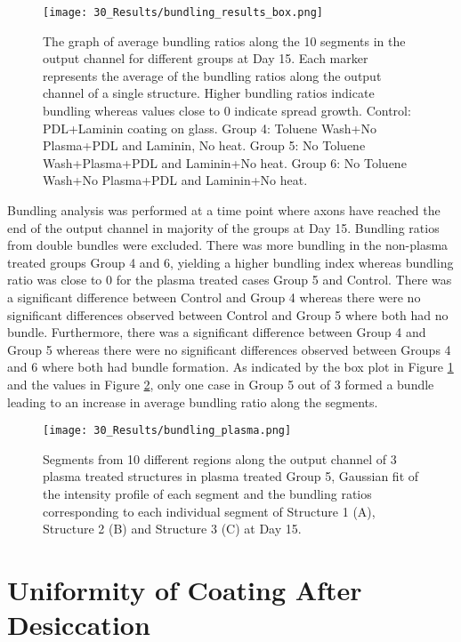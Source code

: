 \begin{figure}[H]
\centering
\texttt{[image: 30\_Results/bundling\_results\_box.png]}
\caption{The graph of average bundling ratios along the 10 segments in the output channel for different groups at Day 15. Each marker represents the average of the bundling ratios along the output channel of a single structure. Higher bundling ratios indicate bundling whereas values close to 0 indicate spread growth. Control: PDL+Laminin coating on glass. Group 4: Toluene Wash+No Plasma+PDL and Laminin, No heat. Group 5: No Toluene Wash+Plasma+PDL and Laminin+No heat. Group 6: No Toluene Wash+No Plasma+PDL and Laminin+No heat.}
\label{fig:BundlingRatios}
\end{figure}

Bundling analysis was performed at a time point where axons have reached the end of the output channel in majority of the groups at Day 15. Bundling ratios from double bundles were excluded. There was more bundling in the non-plasma treated groups Group 4 and 6, yielding a higher bundling index whereas bundling ratio was close to 0 for the plasma treated cases Group 5 and Control. There was a significant difference between Control and Group 4 whereas there were no significant differences observed between Control and Group 5 where both had no bundle. Furthermore, there was a significant difference between Group 4 and Group 5 whereas there were no significant differences observed between Groups 4 and 6 where both had bundle formation. As indicated by the box plot in Figure \ref{fig:BundlingRatios} and the values in Figure \ref{fig:BundlingRatios_plasma}, only one case in Group 5 out of 3 formed a bundle leading to an increase in average bundling ratio along the segments.

\begin{figure}[H]
\centering
\texttt{[image: 30\_Results/bundling\_plasma.png]}
\caption{Segments from 10 different regions along the output channel of 3 plasma treated structures in plasma treated Group 5, Gaussian fit of the intensity profile of each segment and the bundling ratios corresponding to each individual segment of Structure 1 (A), Structure 2 (B) and Structure 3 (C) at Day 15.}
\label{fig:BundlingRatios_plasma}
\end{figure}

\section{Uniformity of Coating After Desiccation}

